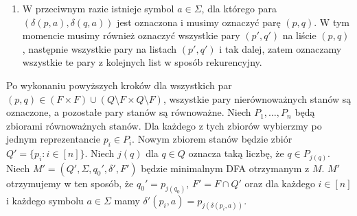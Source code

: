 \begin{enumerate}
\begin{enumerate}
        \item W przeciwnym razie istnieje symbol $a\in\Sigma$, dla którego para $(\delta(p,a),\delta(q,a))$ jest oznaczona i musimy oznaczyć parę $(p,q)$. W tym momencie musimy również oznaczyć wszystkie pary $(p',q')$ na liście $(p,q)$, następnie wszystkie pary na listach $(p',q')$ i tak dalej, zatem oznaczamy wszystkie te pary z kolejnych list w sposób rekurencyjny.
    \end{enumerate}
    Po wykonaniu powyższych kroków dla wszystkich par $(p,q)\in (F\times F)\cup(Q\setminus F\times Q\setminus F)$, wszystkie pary nierównoważnych stanów są oznaczone, a pozostałe pary stanów są równoważne. Niech $P_1,\dotsc,P_n$ będą zbiorami równoważnych stanów. Dla każdego z tych zbiorów wybierzmy po jednym reprezentancie $p_i\in P_i$. Nowym zbiorem stanów będzie zbiór $Q'=\{p_i:i\in[n]\}$. Niech $j(q)$ dla $q\in Q$ oznacza taką liczbę, że $q\in P_{j(q)}$. Niech $M'=(Q',\Sigma,q_0',\delta',F')$ będzie minimalnym DFA otrzymanym z $M$. $M'$ otrzymujemy w ten sposób, że $q_0'=p_{j(q_0)}$, $F'=F\cap Q'$ oraz dla każdego $i\in[n]$ i każdego symbolu $a\in\Sigma$ mamy $\delta'(p_i,a)=p_{j(\delta(p_i,a))}$.
    
\end{enumerate}